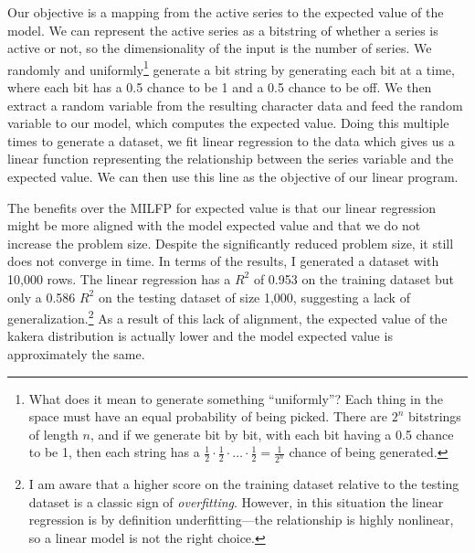 \documentclass[11pt, oneside]{article}
\theoremstyle{plain}
\theoremstyle{definition}
\begin{document}
Our objective is a mapping from the active series to the expected value of
the model. We can represent the active series as a bitstring of whether a
series is active or not, so the dimensionality of the input is the number
of series. We randomly and uniformly\footnote{What does it mean to generate
something \enquote{uniformly}? Each thing in the space must have an equal
probability of being picked. There are \( 2^n \) bitstrings of length \(
n \), and if we generate bit by bit, with each bit having a 0.5 chance to
be 1, then each string has a \( \frac{1}{2} \cdot \frac{1}{2} \cdot \ldots
\cdot \frac{1}{2} = \frac{1}{2^n} \) chance of being generated.} generate a
bit string by generating each bit at a time, where each bit has a 0.5 chance
to be 1 and a 0.5 chance to be off. We then extract a random variable from
the resulting character data and feed the random variable to our model,
which computes the expected value. Doing this multiple times to generate a
dataset, we fit linear regression to the data which gives us a linear function
representing the relationship between the series variable and the expected
value. We can then use this line as the objective of our linear program.

The benefits over the MILFP for expected value is that our linear regression
might be more aligned with the model expected value and that we do not increase
the problem size. Despite the significantly reduced problem size, it still
does not converge in time. In terms of the results, I generated a dataset with
10,000 rows. The linear regression has a \( R^2 \) of 0.953 on the training
dataset but only a 0.586 \( R^2 \) on the testing dataset of size 1,000,
suggesting a lack of generalization.\footnote{I am aware that a higher score
on the training dataset relative to the testing dataset is a classic sign of
\textit{overfitting}. However, in this situation the linear regression is by
definition underfitting---the relationship is highly nonlinear, so a linear
model is not the right choice.} As a result of this lack of alignment, the
expected value of the kakera distribution is actually lower and the model
expected value is approximately the same.
\end{document}
